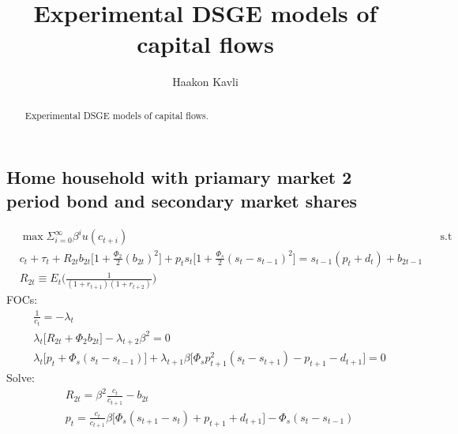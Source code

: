 \documentclass[a4paper]{article}
\begin{document}
\title{Experimental DSGE models of capital flows}
\author{Haakon Kavli}
\maketitle
\begin{abstract}
Experimental DSGE models of capital flows. 
\end{abstract}
\subsection{Home household with priamary market 2 period bond and secondary market shares}
\begin{align}
&\max \Sigma_{i=0}^\infty \beta^i u(c_{t+i}) &&\text{s.t}\\
&c_t+\tau_t+R_{2t} b_{2t} \big[1+ \frac{\Phi_2}{2}(b_{2t})^2 \big] + p_ts_t\big[1+\frac{\Phi_s}{2}(s_t-s_{t-1})^2\big]=s_{t-1} (p_t+d_t) + b_{2t-1}\\
&R_{2t} \equiv E_t\bigg(\frac{1}{(1+r_{t+1})(1+r_{t+2})} \bigg)
\end{align}
FOCs:
\begin{align}
&\frac{1}{c_t}=-\lambda_t\\
&\lambda_t\big[R_{2t}+\Phi_2 b_{2t}\big]-\lambda_{t+2}\beta^2=0\\
&\lambda_t \big[p_t + \Phi_s (s_t-s_{t-1})\big] + \lambda_{t+1} \beta \big[\Phi_s p_{t+1}^2 (s_t-s_{t+1}) - p_{t+1}-d_{t+1}\big]=0
\end{align}
Solve:
\begin{align}
&R_{2t}=\beta^2\frac{c_t}{c_{t+1}}-b_{2t}\\
&p_t=\frac{c_t}{c_{t+1}}\beta \bigg[ \Phi_s (s_{t+1}-s_t)+p_{t+1}+d_{t+1} \bigg] - \Phi_s (s_t - s_{t-1})
\end{align}
\end{document}
